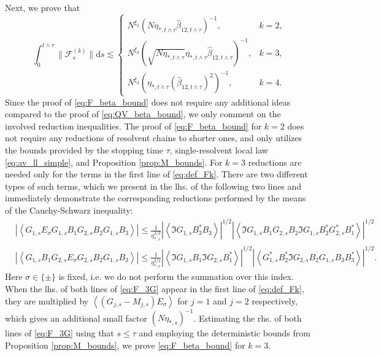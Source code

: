 \documentclass[10pt]{amsart}
\numberwithin{equation}{section}
\newcommand{\dif}{\mathrm{d}}
\begin{document}
Next, we prove that
\begin{equation}
\int_0^{t\wedge\tau} \|\mathcal{F}^{(k)}_s\| \dif s \lesssim 
\begin{cases}
N^{\xi_2}(N\eta_{*,t\wedge\tau}\widehat{\beta}_{12,t\wedge\tau})^{-1},&k=2,\\
N^{\xi_3}(\sqrt{N\eta_{*,t\wedge\tau}}\eta_{*,t\wedge\tau}\widehat{\beta}_{12,t\wedge\tau})^{-1},&k=3,\\
N^{\xi_4}(\eta_{*,t\wedge\tau}(\widehat{\beta}_{12,t\wedge\tau})^2)^{-1},&k=4.
\end{cases}
\label{eq:F_beta_bound}
\end{equation}
Since the proof of \eqref{eq:F_beta_bound} does not require any additional ideas compared to the proof of \eqref{eq:QV_beta_bound}, we only comment on the involved reduction inequalities. The proof of \eqref{eq:F_beta_bound} for $k=2$ does not require any reductions of resolvent chains to shorter ones, and only utilizes the bounds provided by the stopping time $\tau$, single-resolvent local law \eqref{eq:av_ll_simple}, and Proposition \ref{prop:M_bounds}. For $k=3$ reductions are needed only for the terms in the first line of \eqref{eq:def_Fk}. There are two different types of such terms, which we present in the lhs. of the following two lines and immediately demonstrate the corresponding reductions performed by the means of the Cauchy-Schwarz inequality:
\begin{equation}
\begin{split}
&\left\vert\left\langle G_{1,s}E_\sigma G_{1,s}B_1G_{2,s}B_2G_{1,s}B_3\right\rangle\right\vert \le \frac{1}{\eta_{*,s}^{3/2}}\left\vert\left\langle \Im G_{1,s}B_3^*B_3\right\rangle\right\vert^{1/2}\left\vert\left\langle \Im G_{1,s}B_1G_{2,s}B_2\Im G_{1,s}B_2^*G_{2,s}^*B_1^*\right\rangle\right\vert^{1/2}\\
&\left\vert\left\langle G_{1,s}B_1G_{2,s}E_\sigma G_{2,s}B_2G_{1,s}B_3\right\rangle\right\vert \le \frac{1}{\eta_{*,s}^{3/2}}\left\vert\left\langle \Im G_{1,s}B_1\Im G_{2,s}B_1^*\right\rangle\right\vert^{1/2}\left\vert\left\langle G_{1,s}^*B_2^*\Im G_{2,s}B_2G_{1,s}B_3B_3^*\right\rangle\right\vert^{1/2}.
\end{split}
\label{eq:F_3G}
\end{equation}
Here $\sigma\in \{\pm\}$ is fixed, i.e. we do not perform the summation over this index. When the lhs. of both lines of \eqref{eq:F_3G} appear in the first line of \eqref{eq:def_Fk}, they are multiplied by $\left\langle (G_{j,s}-M_{j,s})E_\sigma\right\rangle$ for $j=1$ and $j=2$ respectively, which gives an additional small factor $(N\eta_{*,s})^{-1}$. Estimating the rhs. of both lines of \eqref{eq:F_3G} using that $s\le \tau$ and employing the deterministic bounds from Proposition \ref{prop:M_bounds}, we prove \eqref{eq:F_beta_bound} for $k=3$.
\end{document}
